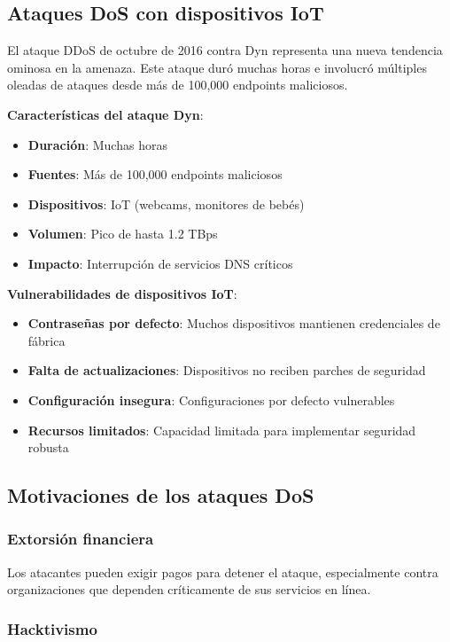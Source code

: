 \subsection{Ataques DoS con dispositivos IoT}

El ataque DDoS de octubre de 2016 contra Dyn representa una nueva tendencia ominosa en la amenaza. Este ataque duró muchas horas e involucró múltiples oleadas de ataques desde más de 100,000 endpoints maliciosos.

\textbf{Características del ataque Dyn}:
\begin{itemize}
    \item \textbf{Duración}: Muchas horas
    \item \textbf{Fuentes}: Más de 100,000 endpoints maliciosos
    \item \textbf{Dispositivos}: IoT (webcams, monitores de bebés)
    \item \textbf{Volumen}: Pico de hasta 1.2 TBps
    \item \textbf{Impacto}: Interrupción de servicios DNS críticos
\end{itemize}

\textbf{Vulnerabilidades de dispositivos IoT}:
\begin{itemize}
    \item \textbf{Contraseñas por defecto}: Muchos dispositivos mantienen credenciales de fábrica
    \item \textbf{Falta de actualizaciones}: Dispositivos no reciben parches de seguridad
    \item \textbf{Configuración insegura}: Configuraciones por defecto vulnerables
    \item \textbf{Recursos limitados}: Capacidad limitada para implementar seguridad robusta
\end{itemize}

\subsection{Motivaciones de los ataques DoS}

\subsubsection{Extorsión financiera}

Los atacantes pueden exigir pagos para detener el ataque, especialmente contra organizaciones que dependen críticamente de sus servicios en línea.

\subsubsection{Hacktivismo}

